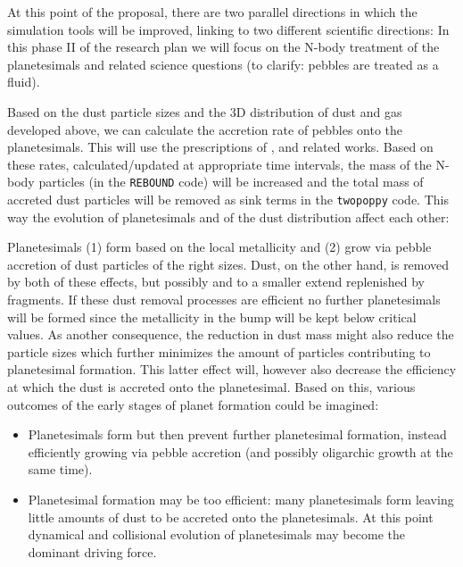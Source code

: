 \documentclass[10pt,fleqn,twoside]{article}
\newcommand{\twopoppy}{\texttt{twopoppy}\xspace}
\newcommand{\rebound}{\texttt{REBOUND}\xspace}
\begin{document}
At this point of the proposal, there are two parallel directions in
which the simulation tools will be improved, linking to two different
scientific directions:  In this phase II of the research plan
we will focus on the N-body treatment of the planetesimals and related science
questions (to clarify: pebbles are treated as a fluid).

Based on the dust particle sizes and the 3D distribution of dust and
gas developed above, we can calculate the accretion rate of pebbles
onto the planetesimals. This will use the prescriptions of
\citet{2010A&A...520A..43O}, \citet{2016A&A...586A..66V} and related
works. Based on these rates, calculated/updated at appropriate time
intervals, the mass of the N-body particles (in the \rebound code)
will be increased and the total mass of accreted dust particles will
be removed as sink terms in the \twopoppy code. This way the evolution
of planetesimals and of the dust distribution affect each other:

Planetesimals (1) form based on the local metallicity and (2) grow via
pebble accretion of dust particles of the right sizes. Dust, on the
other hand, is removed by both of these effects, but possibly and to a
smaller extend replenished by fragments. If these dust removal
processes are efficient no further planetesimals will be formed since
the metallicity in the bump will be kept below critical values.
As another consequence, the reduction in dust mass might also reduce
the particle sizes which further minimizes the amount of particles
contributing to planetesimal formation. This latter effect will,
however also decrease the efficiency at which the dust is accreted
onto the planetesimal.
Based on this, various outcomes of the early stages of planet
formation could be imagined:
\begin{itemize}
  \item Planetesimals form but then prevent further planetesimal
  formation, instead efficiently growing via pebble accretion (and
  possibly oligarchic growth at the same time).
  \item  Planetesimal formation may be too efficient: many
  planetesimals form leaving little amounts of dust to be accreted
  onto the planetesimals. At this point dynamical and collisional
  evolution of planetesimals may become the dominant driving force.
\end{itemize}
\end{document}
